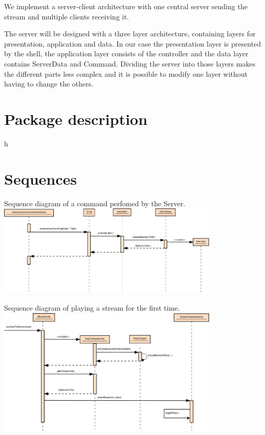 \documentclass[a4paper,10pt]{scrartcl}
\begin{document}
We implement a server-client architecture with one central server sending the stream and multiple clients receiving it.




The server will be designed with a three layer architecture, containing layers for presentation, application and data. In our case 
the presentation layer is presented by the shell, the application layer consists of the controller and the data layer contains ServerData and Command. Dividing the server into those layers makes the different parts less complex and it is possible to modify one layer without having to change the others.



\section{Package description}




h




\section{Sequences}
\begin{illustration}{Sequence diagram of a command perfomed by the Server.}
\includegraphics [width=400px] {figures/sequence_diagram_server/Server1.pdf}
\end{illustration}
\begin{illustration}{Sequence diagram of playing a stream for the first time.}
\includegraphics [width=400px] {figures/sequence_diagram_client/sequence_client.pdf}
\end{illustration}
\end{document}
